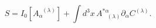 \begin{equation}
S=I_{0}\left[ A_{\alpha }^{\;\;(\lambda )}\right] +\int
d^{3}x\,A_{\;\;\;(\lambda )}^{*\alpha }\partial _{\alpha }C^{(\lambda )}.
\label{bf105}
\end{equation}

